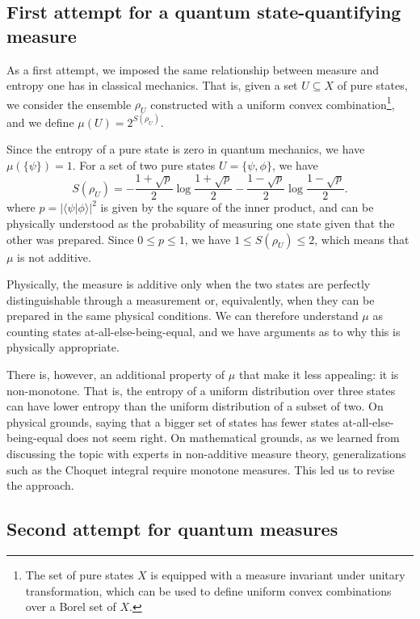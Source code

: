 \documentclass{styles/svproc}
\def\>{\rangle}
\def\<{\langle}
\begin{document}
\subsection{First attempt for a quantum state-quantifying measure}

As a first attempt\cite{aop-phys-QuantumRequiresNonAdditiveMeasures}, we imposed the same relationship between measure and entropy one has in classical mechanics. That is, given a set $U \subseteq X$ of pure states, we consider the ensemble $\rho_U$ constructed with a uniform convex combination\footnote{The set of pure states $X$ is equipped with a measure invariant under unitary transformation, which can be used to define uniform convex combinations over a Borel set of $X$.}, and we define $\mu(U) = 2^{S(\rho_U)}$.

Since the entropy of a pure state is zero in quantum mechanics, we have $\mu(\{\psi\}) = 1$. For a set of two pure states $U = \{ \psi, \phi \}$, we have 
\begin{equation}
	S(\rho_U) = - \frac{1+\sqrt{p}}{2} \log \frac{1+\sqrt{p}}{2} 
	- \frac{1-\sqrt{p}}{2} \log \frac{1-\sqrt{p}}{2}.
\end{equation}
where $p=|\<\psi | \phi \>|^2$ is given by the square of the inner product, and can be physically understood as the probability of measuring one state given that the other was prepared. Since $0 \leq p \leq 1$, we have $1 \leq S(\rho_U) \leq 2$, which means that $\mu$ is not additive.

Physically, the measure is additive only when the two states are perfectly distinguishable through a measurement or, equivalently, when they can be prepared in the same physical conditions. We can therefore understand $\mu$ as counting states at-all-else-being-equal, and we have arguments as to why this is physically appropriate.

There is, however, an additional property of $\mu$ that make it less appealing: it is non-monotone. That is, the entropy of a uniform distribution over three states can have lower entropy than the uniform distribution of a subset of two. On physical grounds, saying that a bigger set of states has fewer states at-all-else-being-equal does not seem right. On mathematical grounds, as we learned from discussing the topic with experts in non-additive measure theory, generalizations such as the Choquet integral require monotone measures. This led us to revise the approach.

\subsection{Second attempt for quantum measures}
\end{document}
